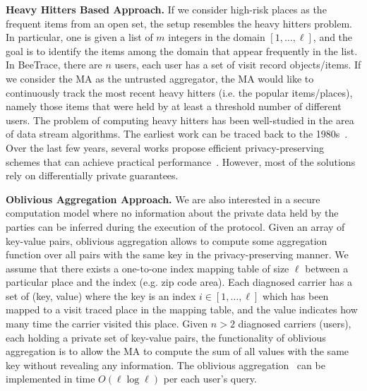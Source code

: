 \documentclass[11pt]{article}  %
\newcommand{\sysname}{\textsf{BeeTrace}\xspace}
\begin{document}
\textbf{Heavy Hitters Based Approach.} If we consider high-risk places as the frequent items from an open set, the setup resembles the heavy hitters problem. In particular, one is given a list of $m$ integers in the domain $[1, \ldots, \ell]$, and the goal is to identify the items among the domain that appear frequently in the list. In \sysname, there are $n$ users, each user has a set of visit record objects/items. If we consider the MA as the untrusted aggregator, the MA would like to continuously track the most recent heavy hitters (i.e. the popular items/places), namely those items that were held by at least a threshold number of different users. %
The problem of computing heavy hitters has been well-studied in the area of data stream algorithms. The earliest work can be traced back to the 1980s~\cite{BoyerHeavyhitter81}. Over the last few years, several works propose  efficient privacy-preserving schemes that can achieve practical performance~\cite{BassilyNeurIPs17}. However, most of the solutions rely on  differentially private guarantees. 

\textbf{Oblivious Aggregation Approach.} We are also interested in a secure computation model where no information about the private data held by the parties can be inferred during the execution of the protocol.  Given an array of key-value pairs, oblivious aggregation allows to compute some aggregation function over all pairs with the same key in the privacy-preserving manner. %
We assume that there exists a one-to-one index mapping table of size $\ell$ between a particular place and the index (e.g. zip code area). Each diagnosed carrier has a set of (key, value) where the key is an index $i \in [1, \ldots, \ell]$ which has been mapped to a visit traced place in the mapping table, and the value indicates how many time the carrier visited this place. Given $n>2$ diagnosed carriers (users), each holding a private set of key-value pairs, the functionality of oblivious aggregation is to allow the MA to compute the sum of all values with the same key without revealing any information. The oblivious aggregation~\cite{Boyle2016, SOda19} can be implemented in time $O(\ell \log \ell)$ per each user's query. %

\end{document}
